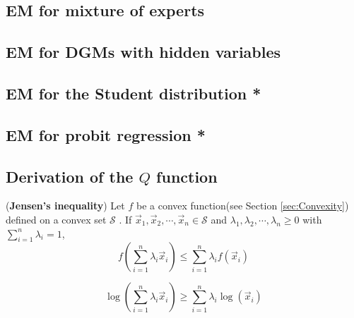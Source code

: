 \subsection{EM for mixture of experts}


\subsection{EM for DGMs with hidden variables}


\subsection{EM for the Student distribution *}


\subsection{EM for probit regression *}


\subsection{Derivation of the $Q$ function}
\label{sec:Derivation-of-the-Q-function}

\begin{theorem}
(\textbf{Jensen's inequality}) Let $f$ be a convex function(see Section \ref{sec:Convexity}) defined on a convex set $\mathcal{S}$ . If $\vec{x}_1, \vec{x}_2, \cdots , \vec{x}_n \in \mathcal{S}$ and $\lambda_1, \lambda_2, \cdots , \lambda_n \geq 0$ with $\sum\limits_{i=1}^n \lambda_i=1$,
\begin{equation}
f\left(\sum\limits_{i=1}^n \lambda_i\vec{x}_i\right) \leq \sum\limits_{i=1}^n {\lambda_i f(\vec{x}_i)}
\end{equation}
\end{theorem}

\begin{proposition}
\begin{equation}
\log\left(\sum\limits_{i=1}^n \lambda_i\vec{x}_i\right) \geq \sum\limits_{i=1}^n {\lambda_i \log(\vec{x}_i)}
\end{equation}
\end{proposition}

